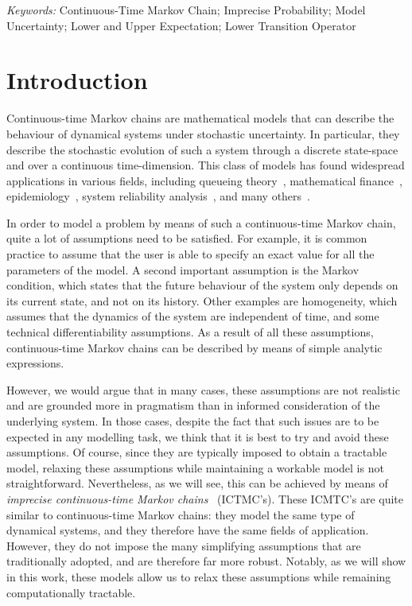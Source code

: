 \documentclass[10pt,a4paper]{paper}
\theoremstyle{definition}
\begin{document}
\noindent\emph{Keywords:} Continuous-Time Markov Chain; Imprecise Probability; Model Uncertainty; Lower and Upper Expectation; Lower Transition Operator


\newpage
\section{Introduction}\label{sec:introduction}

Continuous-time Markov chains are mathematical models that can describe the behaviour of dynamical systems under stochastic uncertainty. In particular, they describe the stochastic evolution of such a system through a discrete state-space and over a continuous time-dimension. This class of models has found widespread applications in various fields, including queueing theory~\cite{asmussen2008applied,bolch2006queueing}, mathematical finance~\cite{elliott2013default, rolski2009stochastic,sass2004optimizing}, epidemiology~\cite{ duffy1995estimation,jackson2003multistate, lemey2009reconstructing}, system reliability analysis~\cite{besnard2010approach,gokhale2004analysis, wang2007reliability}, and many others~\cite{yin2012continuous}.

In order to model a problem by means of such a continuous-time Markov chain, quite a lot of assumptions need to be satisfied.
For example, it is common practice to assume that the user is able to specify an exact value for all the parameters of the model.
A second important assumption is the Markov condition, which states that the future behaviour of the system only depends on its current state, and not on its history. Other examples are homogeneity, which assumes that the dynamics of the system are independent of time, and some technical differentiability assumptions. 
As a result of all these assumptions, continuous-time Markov chains can be described by means of simple analytic expressions. 


However, we would argue that in many cases, these assumptions are not realistic and are grounded more in pragmatism than in informed consideration of the underlying system. In those cases, despite the fact that such issues are to be expected in any modelling task, we think that it is best to try and avoid these assumptions. Of course, since they are typically imposed to obtain a tractable model, relaxing these assumptions while maintaining a workable model is not straightforward. 
Nevertheless, as we will see, this can be achieved by means of \emph{imprecise continuous-time Markov chains}~\cite{Skulj:2015cq,troffaes2015using} (ICTMC's). These ICMTC's are quite similar to continuous-time Markov chains: they model the same type of dynamical systems, and they therefore have the same fields of application. However, they do not impose the many simplifying assumptions that are traditionally adopted, and are therefore far more robust. Notably, as we will show in this work, these models allow us to relax these assumptions while remaining computationally tractable.
\end{document}
